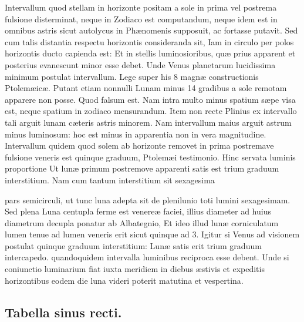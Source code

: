 \documentclass[11pt,a4paper]{article}
\begin{document}
Intervallum quod stellam in horizonte positam a sole in prima vel postrema fulsione disterminat, neque in Zodiaco est computandum, neque idem est in omnibus astris sicut autolycus in Phænomenis supposuit, ac fortasse putavit. Sed cum talis distantia respectu horizontis consideranda sit, Iam in circulo per polos horizontis ducto capienda est: Et in stellis luminosioribus, quæ prius apparent et posterius evanescunt minor esse debet. Unde Venus planetarum lucidissima minimum postulat intervallum. Lege super his 8 magnæ constructionis Ptolemæicæ. Putant etiam nonnulli Lunam minus 14 gradibus a sole remotam apparere non posse. Quod falsum est. Nam intra multo minus spatium sæpe visa est, neque spatium in zodiaco mensurandum. Item non recte Plinius ex intervallo tali arguit lunam cæteris astris minorem. Nam intervallum maius arguit astrum minus luminosum: hoc est minus in apparentia non in vera magnitudine. Intervallum quidem quod solem ab horizonte removet in prima postremave fulsione veneris est quinque graduum, Ptolemæi testimonio. Hinc servata luminis proportione Ut lunæ primum postremove apparenti satis est trium graduum interstitium. Nam cum tantum interstitium sit sexagesima

pars semicirculi, ut tunc luna adepta sit de plenilunio toti lumini sexagesimam. Sed plena Luna centupla ferme est venereæ faciei,  illius diameter ad huius diametrum decupla ponatur ab Albategnio, Et ideo illud lunæ corniculatum lumen tenue ad lumen veneris erit sicut quinque ad 3. Igitur si Venus ad visionem postulat quinque graduum interstitium: Lunæ satis erit trium graduum intercapedo. quandoquidem intervalla luminibus reciproca esse debent. Unde si coniunctio luminarium fiat iuxta meridiem in diebus æstivis et expeditis horizontibus eodem die luna videri poterit matutina et vespertina.

\subsection*{Tabella sinus recti.}
\end{document}

